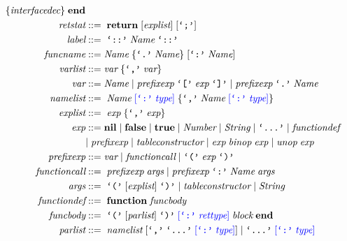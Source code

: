 \begin{align*}
{  \{\textit{interfacedec}\} \; \textbf{end}}\\
\textit{retstat} & ::= \; \textbf{return} \; [\textit{explist}] \; [\texttt{`;'}]\\
\textit{label} & ::= \; \texttt{`::'} \; \textit{Name} \; \texttt{`::'}\\
\textit{funcname} & ::= \textit{Name} \; \{\texttt{`.'} \; \textit{Name}\} \; [\texttt{`:'} \; \textit{Name}]\\
\textit{varlist} & ::= \textit{var} \; \{\texttt{`,'} \; \textit{var}\}\\
\textit{var} & ::= \textit{Name} \; | \;
  \textit{prefixexp} \; \texttt{`['} \; \textit{exp} \; \texttt{`]'} \; | \;
  \textit{prefixexp} \; \texttt{`.'} \; \textit{Name}\\
\textit{namelist} & ::= \; \textit{Name} \; \textcolor{blue}{[\texttt{`:'} \; \textit{type}]} \;
  \{\texttt{`,'} \; \textit{Name} \; \textcolor{blue}{[\texttt{`:'} \; \textit{type}]}\}\\
\textit{explist} & ::= \; \textit{exp} \; \{\texttt{`,'} \; \textit{exp}\}\\
\textit{exp} & ::= \textbf{nil} \; | \;
  \textbf{false} \; | \;
  \textbf{true} \; | \;
  \textit{Number} \; | \;
  \textit{String} \; | \;
  \texttt{`...'} \; | \;
  \textit{functiondef}\\
& | \; \textit{prefixexp} \; | \;
  \textit{tableconstructor} \; | \;
  \textit{exp} \; \textit{binop} \; \textit{exp} \; | \;
  \textit{unop} \; \textit{exp}\\
\textit{prefixexp} & ::= \textit{var} \; | \;
  \textit{functioncall} \; | \;
  \texttt{`('} \; \textit{exp} \; \texttt{`)'}\\
\textit{functioncall} & ::= \; \textit{prefixexp} \; \textit{args} \; | \;
  \textit{prefixexp} \; \texttt{`:'} \; \textit{Name} \; \textit{args}\\
\textit{args} & ::= \; \texttt{`('} \; [\textit{explist}] \; \texttt{`)'} \; | \;
  \textit{tableconstructor} \; | \;
  \textit{String}\\
\textit{functiondef} & ::= \; \textbf{function} \; \textit{funcbody}\\
\textit{funcbody} & ::= \; \texttt{`('} \; [\textit{parlist}] \; \texttt{`)'} \;
  \textcolor{blue}{[\texttt{`:'} \; \textit{rettype}]} \; \textit{block} \; \textbf{end}\\
\textit{parlist} & ::= \; \textit{namelist} \; [\texttt{`,'} \; \texttt{`...'} \;
  \textcolor{blue}{[\texttt{`:'} \; \textit{type}]}] \; | \;
  \texttt{`...'} \; \textcolor{blue}{[\texttt{`:'} \; \textit{type}]}\\

\end{align*}
